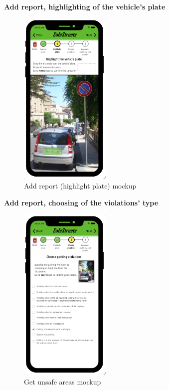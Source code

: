 					\clearpage
					\begin{center}
						{\small \textbf{Add report, highlighting of the vehicle's plate}}
					\end{center}
					\vspace{-5mm}
					\begin{figure}[!h]
						\centering
						\includegraphics[height=8.5cm]{images/MockUp/User/Report2HighlightPlate.pdf}
						\caption{Add report (highlight plate) mockup}
					\end{figure}
					\vspace{-1mm}
					\begin{center}
						{\small \textbf{Add report, choosing of the violations' type}}
					\end{center}
					\vspace{-5mm}
					\begin{figure}[!h]
						\centering
						\includegraphics[height=8.5cm]{images/MockUp/User/Report3ChooseViolation.pdf}
						\caption{Get unsafe areas mockup}
					\end{figure}
